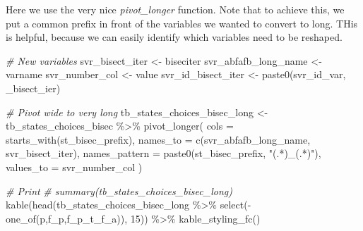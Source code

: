 \documentclass[
]{book}
\newenvironment{Shaded}{\begin{snugshade}}{\end{snugshade}}
\newcommand{\AttributeTok}[1]{\textcolor[rgb]{0.77,0.63,0.00}{#1}}
\newcommand{\CommentTok}[1]{\textcolor[rgb]{0.56,0.35,0.01}{\textit{#1}}}
\newcommand{\DecValTok}[1]{\textcolor[rgb]{0.00,0.00,0.81}{#1}}
\newcommand{\FunctionTok}[1]{\textcolor[rgb]{0.00,0.00,0.00}{#1}}
\newcommand{\NormalTok}[1]{#1}
\newcommand{\OtherTok}[1]{\textcolor[rgb]{0.56,0.35,0.01}{#1}}
\newcommand{\SpecialCharTok}[1]{\textcolor[rgb]{0.00,0.00,0.00}{#1}}
\newcommand{\StringTok}[1]{\textcolor[rgb]{0.31,0.60,0.02}{#1}}
\begin{document}
Here we use the very nice \emph{pivot\_longer} function. Note that to achieve this, we put a common prefix in front of the variables we wanted to convert to long. THis is helpful, because we can easily identify which variables need to be reshaped.

\begin{Shaded}
\begin{Highlighting}[]
\CommentTok{\# New variables}
\NormalTok{svr\_bisect\_iter }\OtherTok{\textless{}{-}} \StringTok{\textquotesingle{}biseciter\textquotesingle{}}
\NormalTok{svr\_abfafb\_long\_name }\OtherTok{\textless{}{-}} \StringTok{\textquotesingle{}varname\textquotesingle{}}
\NormalTok{svr\_number\_col }\OtherTok{\textless{}{-}} \StringTok{\textquotesingle{}value\textquotesingle{}}
\NormalTok{svr\_id\_bisect\_iter }\OtherTok{\textless{}{-}} \FunctionTok{paste0}\NormalTok{(svr\_id\_var, }\StringTok{\textquotesingle{}\_bisect\_ier\textquotesingle{}}\NormalTok{)}

\CommentTok{\# Pivot wide to very long}
\NormalTok{tb\_states\_choices\_bisec\_long }\OtherTok{\textless{}{-}}\NormalTok{ tb\_states\_choices\_bisec }\SpecialCharTok{\%\textgreater{}\%}
  \FunctionTok{pivot\_longer}\NormalTok{(}
    \AttributeTok{cols =} \FunctionTok{starts\_with}\NormalTok{(st\_bisec\_prefix),}
    \AttributeTok{names\_to =} \FunctionTok{c}\NormalTok{(svr\_abfafb\_long\_name, svr\_bisect\_iter),}
    \AttributeTok{names\_pattern =} \FunctionTok{paste0}\NormalTok{(st\_bisec\_prefix, }\StringTok{"(.*)\_(.*)"}\NormalTok{),}
    \AttributeTok{values\_to =}\NormalTok{ svr\_number\_col}
\NormalTok{  )}

\CommentTok{\# Print}
\CommentTok{\# summary(tb\_states\_choices\_bisec\_long)}
\FunctionTok{kable}\NormalTok{(}\FunctionTok{head}\NormalTok{(tb\_states\_choices\_bisec\_long }\SpecialCharTok{\%\textgreater{}\%} 
             \FunctionTok{select}\NormalTok{(}\SpecialCharTok{{-}}\FunctionTok{one\_of}\NormalTok{(}\StringTok{\textquotesingle{}p\textquotesingle{}}\NormalTok{,}\StringTok{\textquotesingle{}f\_p\textquotesingle{}}\NormalTok{,}\StringTok{\textquotesingle{}f\_p\_t\_f\_a\textquotesingle{}}\NormalTok{)), }\DecValTok{15}\NormalTok{)) }\SpecialCharTok{\%\textgreater{}\%} 
  \FunctionTok{kable\_styling\_fc}\NormalTok{()}
\end{Highlighting}
\end{Shaded}
\end{document}
